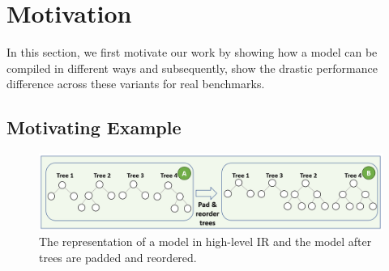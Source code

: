 \section{Motivation}
\label{sec:motivation}
In this section, we first motivate our work by showing how a model can be compiled in different ways
and subsequently, show the drastic performance difference across these variants for real benchmarks.

\subsection{Motivating Example}
\begin{figure}[htb]
  \centering
  \includegraphics[width=\linewidth]{figures/HIR.PNG}
  \caption{The representation of a model in high-level IR and the model 
  after trees are padded and reordered. }
  \label{Fig:HIRExample}
\end{figure}

